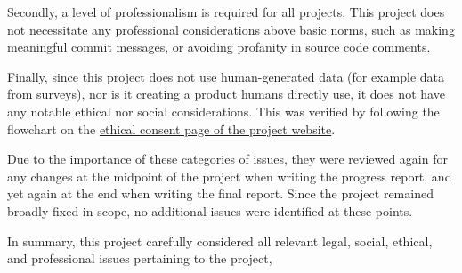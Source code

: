Secondly, a level of professionalism is required for all projects. This project does not necessitate any professional considerations above basic norms, such as making meaningful commit messages, or avoiding profanity in source code comments. %

Finally, since this project does not use human-generated data (for example data from surveys), nor is it creating a product humans directly use, it does not have any notable ethical nor social considerations. This was verified by following the flowchart on the \href{https://warwick.ac.uk/fac/sci/dcs/teaching/ethics}{ethical consent page of the project website}. %

Due to the importance of these categories of issues, they were reviewed again for any changes at the midpoint of the project when writing the progress report, and yet again at the end when writing the final report. Since the project remained broadly fixed in scope, no additional issues were identified at these points.

In summary, this project carefully considered all relevant legal, social, ethical, and professional issues pertaining to the project, 

